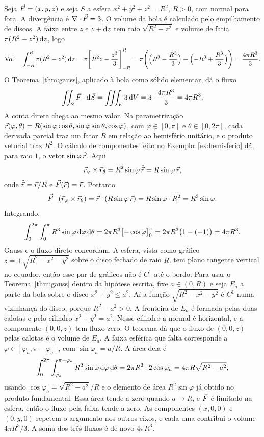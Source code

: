 \documentclass[11pt,a4paper]{article}
\begin{document}
\begin{exemplo}
\label{ex:gauss-esfera}
Seja $\vec{F}=(x,y,z)$ e seja $S$ a esfera $x^2+y^2+z^2=R^2$, $R>0$, com normal para fora. A divergência é $\nabla\cdot\vec{F}=3$. O volume da bola é calculado pelo empilhamento de discos. A faixa entre $z$ e $z+\mathrm{d} z$ tem raio $\sqrt{R^2-z^2}$ e volume de fatia $\pi(R^2-z^2)\,\mathrm{d} z$, logo
\[
\mathrm{Vol}
=\int_{-R}^{R}\pi(R^2-z^2)\,\mathrm{d} z
=\pi\Biggl[R^2 z-\frac{z^3}{3}\Biggr]_{-R}^{R}
=\pi\Biggl(\Bigl(R^3-\frac{R^3}{3}\Bigr)-\Bigl(-R^3+\frac{R^3}{3}\Bigr)\Biggr)
=\frac{4\pi R^3}{3}.
\]
O Teorema~\ref{thm:gauss}, aplicado à bola como sólido elementar, dá o fluxo
\[
\iint_S\vec{F}\cdot\mathrm{d}\vec{S}
=\iiint_E 3\,\mathrm{d} V
=3\cdot\frac{4\pi R^3}{3}
=4\pi R^3.
\]
A conta direta chega ao mesmo valor. Na parametrização $\vec{r}(\varphi,\theta)=R(\sin\varphi\cos\theta,\sin\varphi\sin\theta,\cos\varphi)$, com $\varphi\in[0,\pi]$ e $\theta\in[0,2\pi]$, cada derivada parcial traz um fator $R$ em relação ao hemisfério unitário, e o produto vetorial traz $R^2$. O cálculo de componentes feito no Exemplo~\ref{ex:hemisferio} dá, para raio $1$, o vetor $\sin\varphi\,\hat{\vec{r}}$. Aqui
\[
\vec{r}_\varphi\times\vec{r}_\theta
=R^2\sin\varphi\,\hat{\vec{r}}
=R\sin\varphi\,\vec{r},
\]
onde $\hat{\vec{r}}=\vec{r}/R$ e $\vec{F}(\vec{r})=\vec{r}$. Portanto
\[
\vec{F}\cdot(\vec{r}_\varphi\times\vec{r}_\theta)
=\vec{r}\cdot(R\sin\varphi\,\vec{r})
=R\sin\varphi\cdot R^2
=R^3\sin\varphi.
\]
Integrando,
\[
\int_0^{2\pi}\int_0^{\pi} R^3\sin\varphi\,\mathrm{d}\varphi\,\mathrm{d}\theta
=2\pi R^3\bigl[-\cos\varphi\bigr]_0^{\pi}
=2\pi R^3\bigl(1-(-1)\bigr)
=4\pi R^3.
\]
Gauss e o fluxo direto concordam. A esfera, vista como gráfico $z=\pm\sqrt{R^2-x^2-y^2}$ sobre o disco fechado de raio $R$, tem plano tangente vertical no equador, então esse par de gráficos não é $C^1$ até o bordo. Para usar o Teorema~\ref{thm:gauss} dentro da hipótese escrita, fixe $a\in(0,R)$ e seja $E_a$ a parte da bola sobre o disco $x^2+y^2\le a^2$. Aí a função $\sqrt{R^2-x^2-y^2}$ é $C^1$ numa vizinhança do disco, porque $R^2-a^2>0$. A fronteira de $E_a$ é formada pelas duas calotas e pelo cilindro $x^2+y^2=a^2$. Nesse cilindro a normal é horizontal, e a componente $(0,0,z)$ tem fluxo zero. O teorema dá que o fluxo de $(0,0,z)$ pelas calotas é o volume de $E_a$. A faixa esférica que falta corresponde a $\varphi\in[\varphi_a,\pi-\varphi_a]$, com $\sin\varphi_a=a/R$. A área dela é
\[
\int_0^{2\pi}\int_{\varphi_a}^{\pi-\varphi_a} R^2\sin\varphi\,\mathrm{d}\varphi\,\mathrm{d}\theta
=2\pi R^2\cdot 2\cos\varphi_a
=4\pi R\sqrt{R^2-a^2},
\]
usando $\cos\varphi_a=\sqrt{R^2-a^2}/R$ e o elemento de área $R^2\sin\varphi$ já obtido no produto fundamental. Essa área tende a zero quando $a\to R$, e $\vec{F}$ é limitado na esfera, então o fluxo pela faixa tende a zero. As componentes $(x,0,0)$ e $(0,y,0)$ repetem o argumento nos outros eixos, e cada uma contribui o volume $4\pi R^3/3$. A soma dos três fluxos é de novo $4\pi R^3$.
\end{exemplo}
\end{document}
